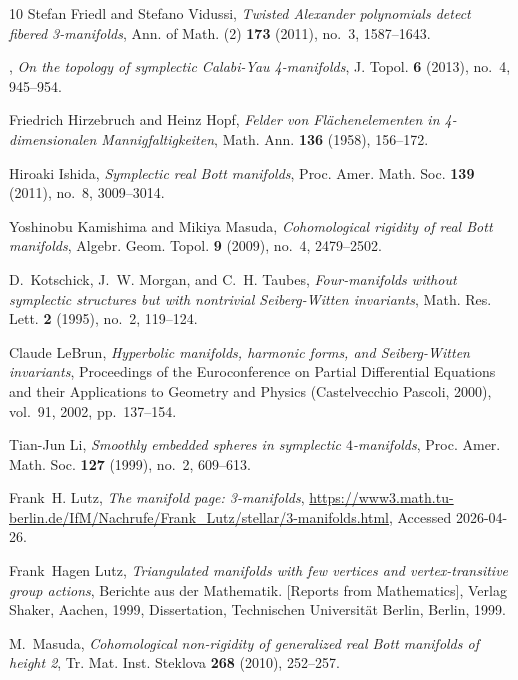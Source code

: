 \documentclass{amsart}
\numberwithin{equation}{section}
\theoremstyle{definition}
\theoremstyle{remark}
\begin{document}
\begin{thebibliography}{10}
Stefan Friedl and Stefano Vidussi, \emph{Twisted {A}lexander polynomials detect
  fibered 3-manifolds}, Ann. of Math. (2) \textbf{173} (2011), no.~3,
  1587--1643. 

\bysame, \emph{On the topology of symplectic {C}alabi-{Y}au 4-manifolds}, J.
  Topol. \textbf{6} (2013), no.~4, 945--954. 

Friedrich Hirzebruch and Heinz Hopf, \emph{Felder von {F}l\"achenelementen in
  4-dimensionalen {M}annigfaltigkeiten}, Math. Ann. \textbf{136} (1958),
  156--172. 

Hiroaki Ishida, \emph{Symplectic real {B}ott manifolds}, Proc. Amer. Math. Soc.
  \textbf{139} (2011), no.~8, 3009--3014. 

Yoshinobu Kamishima and Mikiya Masuda, \emph{Cohomological rigidity of real
  {B}ott manifolds}, Algebr. Geom. Topol. \textbf{9} (2009), no.~4, 2479--2502.

D.~Kotschick, J.~W. Morgan, and C.~H. Taubes, \emph{Four-manifolds without
  symplectic structures but with nontrivial {S}eiberg-{W}itten invariants},
  Math. Res. Lett. \textbf{2} (1995), no.~2, 119--124. 

Claude LeBrun, \emph{Hyperbolic manifolds, harmonic forms, and
  {S}eiberg-{W}itten invariants}, Proceedings of the {E}uroconference on
  {P}artial {D}ifferential {E}quations and their {A}pplications to {G}eometry
  and {P}hysics ({C}astelvecchio {P}ascoli, 2000), vol.~91, 2002, pp.~137--154.

Tian-Jun Li, \emph{Smoothly embedded spheres in symplectic {$4$}-manifolds},
  Proc. Amer. Math. Soc. \textbf{127} (1999), no.~2, 609--613. 

Frank~H. Lutz, \emph{The manifold page: 3-manifolds},
  \url{https://www3.math.tu-berlin.de/IfM/Nachrufe/Frank_Lutz/stellar/3-manifolds.html},
  Accessed 2026-04-26.

Frank~Hagen Lutz, \emph{Triangulated manifolds with few vertices and
  vertex-transitive group actions}, Berichte aus der Mathematik. [Reports from
  Mathematics], Verlag Shaker, Aachen, 1999, Dissertation, Technischen
  Universit\"at Berlin, Berlin, 1999. 

M.~Masuda, \emph{Cohomological non-rigidity of generalized real {B}ott
  manifolds of height 2}, Tr. Mat. Inst. Steklova \textbf{268} (2010),
  252--257. 


\end{thebibliography}
\end{document}

